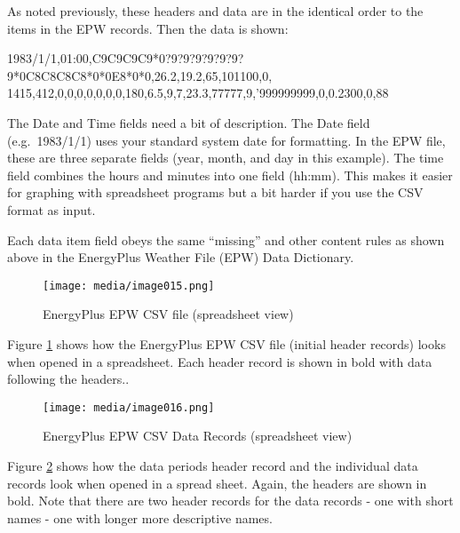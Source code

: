 As noted previously, these headers and data are in the identical order to the items in the EPW records. Then the data is shown:

1983/1/1,01:00,C9C9C9C9*0?9?9?9?9?9?9?9*0C8C8C8C8*0*0E8*0*0,26.2,19.2,65,101100,0, 1415,412,0,0,0,0,0,0,0,180,6.5,9,7,23.3,77777,9,'999999999,0,0.2300,0,88

The Date and Time fields need a bit of description. The Date field (e.g.~1983/1/1) uses your standard system date for formatting. In the EPW file, these are three separate fields (year, month, and day in this example). The time field combines the hours and minutes into one field (hh:mm). This makes it easier for graphing with spreadsheet programs but a bit harder if you use the CSV format as input.

Each data item field obeys the same ``missing'' and other content rules as shown above in the EnergyPlus Weather File (EPW) Data Dictionary.

\begin{figure}[hbtp] %
\centering
\texttt{[image: media/image015.png]}
\caption{EnergyPlus EPW CSV file (spreadsheet view) \protect \label{fig:energyplus-epw-csv-file-spreadsheet-view}}
\end{figure}

Figure \ref{fig:energyplus-epw-csv-file-spreadsheet-view} shows how the EnergyPlus EPW CSV file (initial header records) looks when opened in a spreadsheet. Each header record is shown in bold with data following the headers..

\begin{figure}[hbtp] %
\centering
\texttt{[image: media/image016.png]}
\caption{EnergyPlus EPW CSV Data Records (spreadsheet view) \protect \label{fig:energyplus-epw-csv-data-records-spreadsheet}}
\end{figure}

Figure \ref{fig:energyplus-epw-csv-data-records-spreadsheet} shows how the data periods header record and the individual data records look when opened in a spread sheet. Again, the headers are shown in bold. Note that there are two header records for the data records - one with short names - one with longer more descriptive names.
